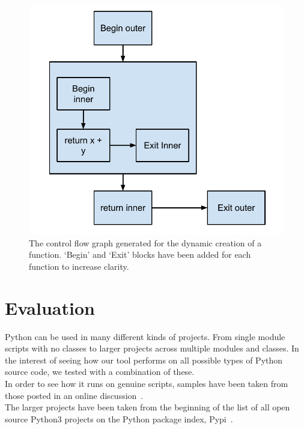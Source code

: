 \documentclass[12pt, titlepage]{article}
\begin{document}
\begin{figure}
\centering
\includegraphics[scale=0.7]{images/dynamicFunctionCFG.pdf}
\caption{The control flow graph generated for the dynamic creation of a function. `Begin' and `Exit' blocks have been added for each function to increase clarity.}
\label{fig:dynamicFuncCFG}
\end{figure}


\newpage
\section{Evaluation}
Python can be used in many different kinds of projects. From single module scripts with no classes to larger projects across multiple modules and classes. In the interest of seeing how our tool performs on  all possible types of Python source code, we tested with a combination of these. \\
\indent In order to see how it runs on genuine scripts, samples have been taken from those posted in an online discussion~\cite{pythonScripts}. \\
\indent The larger projects have been taken from the beginning of the list of all open source Python3 projects on the Python package index, Pypi~\cite{python3Projects}.
\end{document}
